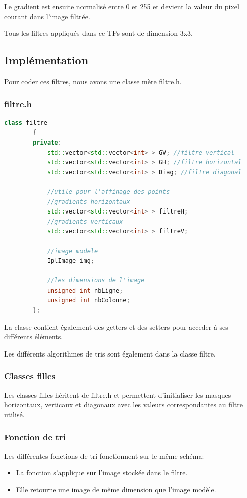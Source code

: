 \documentclass[11pt]{article}
\begin{document}
	Le gradient est ensuite normalisé entre 0 et 255 et devient la valeur du pixel courant dans l'image filtrée.

	Tous les filtres appliqués dans ce TPs sont de dimension 3x3.

	\subsection{Implémentation}

		Pour coder ces filtres, nous avons une classe mère filtre.h. 
		\subsubsection{filtre.h}

		\begin{lstlisting}[caption={Classe filtre},language=C++,label=filtre]
		class filtre
		{
		private:
			std::vector<std::vector<int> > GV; //filtre vertical
			std::vector<std::vector<int> > GH; //filtre horizontal
			std::vector<std::vector<int> > Diag; //filtre diagonal

			//utile pour l'affinage des points
			//gradients horizontaux
			std::vector<std::vector<int> > filtreH; 
			//gradients verticaux
			std::vector<std::vector<int> > filtreV; 

			//image modele
			IplImage img;

			//les dimensions de l'image
			unsigned int nbLigne;
			unsigned int nbColonne;
		};
		\end{lstlisting}

		La classe contient également des getters et des setters pour acceder à ses différents éléments.

		Les différents algorithmes de tris sont également dans la classe filtre.

		\subsubsection{Classes filles}

			Les classes filles héritent de filtre.h et permettent d'initialiser les masques horizontaux, verticaux et diagonaux avec les valeurs correspondantes au filtre utilisé.

		\subsubsection{Fonction de tri}

			Les différentes fonctions de tri fonctionnent sur le même schéma: 
			\begin{itemize}
			\item La fonction s'applique sur l'image stockée dans le filtre.
			\item Elle retourne une image de même dimension que l'image modèle.
			\end{itemize}
\end{document}
